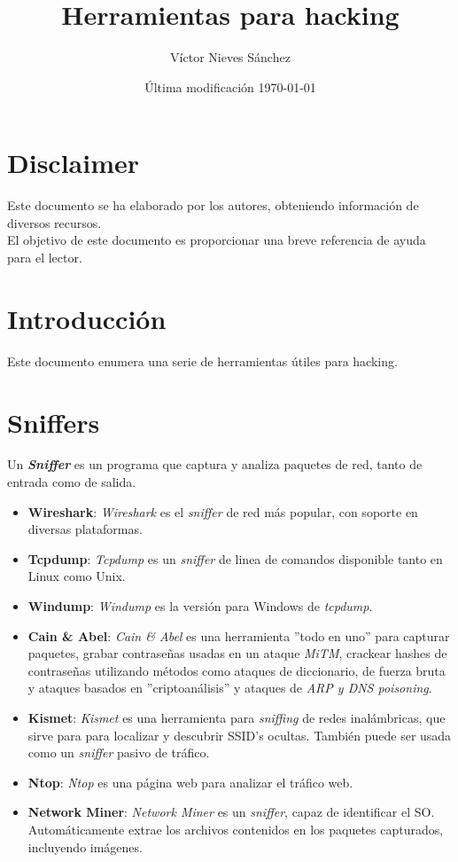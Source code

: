 \documentclass[bibliography=totocnumbered]{scrartcl}
\title{Herramientas para hacking}
\author{Víctor Nieves Sánchez}
\date{Última modificación \today{}}
\begin{document}
\maketitle
\section*{Disclaimer}
Este documento se ha elaborado por los autores, obteniendo información de diversos recursos.\\

El objetivo de este documento es proporcionar una breve referencia de ayuda para el lector.

\newpage
\tableofcontents

\newpage
\listoffigures

\newpage
\section{Introducción}
Este documento enumera una serie de herramientas útiles para hacking.

\section{Sniffers}
Un \textbf{\textit{Sniffer}} es un programa que captura y analiza paquetes de red, tanto de entrada como de salida.
\begin{itemize}
\item \textbf{Wireshark}\parencite{wireshark}: \textit{Wireshark} es el \textit{sniffer} de red más popular, con soporte en diversas plataformas.
\item \textbf{Tcpdump}\parencite{tcpdump}: \textit{Tcpdump} es un \textit{sniffer} de linea de comandos disponible tanto en Linux como Unix.
\item \textbf{Windump}\parencite{windump}: \textit{Windump} es la versión para Windows de \textit{tcpdump}\parencite{tcpdump}.
\item \textbf{Cain \& Abel}\parencite{cain}: \textit{Cain \& Abel} es una herramienta ''todo en uno'' para capturar paquetes, grabar contraseñas usadas en un ataque \textit{MiTM}\parencite{mitm}, crackear hashes de contraseñas utilizando métodos como ataques de diccionario, de fuerza bruta y ataques basados en ''criptoanálisis'' y ataques de \textit{ARP y DNS poisoning}\parencite{arp}\parencite{dns}.
\item \textbf{Kismet}\parencite{kismet}: \textit{Kismet} es una herramienta para \textit{sniffing} de redes inalámbricas, que sirve para para localizar y descubrir SSID's ocultas. También puede ser usada como un \textit{sniffer} pasivo de tráfico.
\item \textbf{Ntop}\parencite{ntop}: \textit{Ntop} es una página web para analizar el tráfico web.
\item \textbf{Network Miner}\parencite{networkminer}: \textit{Network Miner} es un \textit{sniffer}, capaz de identificar el SO. Automáticamente extrae los archivos contenidos en los paquetes capturados, incluyendo imágenes. 
\end{itemize}

\newpage
\nocite{*}
\printbibliography 
\end{document}
